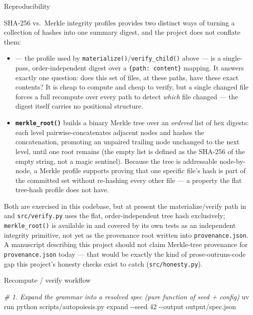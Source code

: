 \documentclass[
  ignorenonframetext,
]{beamer}
\newenvironment{Shaded}{}{}
\newcommand{\AttributeTok}[1]{\textcolor[rgb]{0.49,0.56,0.16}{#1}}
\newcommand{\CommentTok}[1]{\textcolor[rgb]{0.38,0.63,0.69}{\textit{#1}}}
\newcommand{\ExtensionTok}[1]{#1}
\newcommand{\NormalTok}[1]{#1}
\providecommand{\tightlist}{%
  \setlength{\itemsep}{0pt}\setlength{\parskip}{0pt}}
\begin{document}
\begin{frame}{Reproducibility}
\begin{block}{SHA-256 vs.~Merkle integrity profiles}
\protect{}\label{sha-256-vs.-merkle-integrity-profiles}
 provides two distinct ways of turning a
collection of hashes into one summary digest, and the project does not
conflate them:

\begin{itemize}
\tightlist
\item
  \textbf{} --- the profile
  used by \texttt{materialize()}/\texttt{verify\_child()} above --- is a
  single-pass, order-independent digest over a
  \texttt{\{path:\ content\}} mapping. It answers exactly one question:
  does this set of files, at these paths, have these exact contents? It
  is cheap to compute and cheap to verify, but a single changed file
  forces a full recompute over every path to detect \emph{which} file
  changed --- the digest itself carries no positional structure.
\item
  \textbf{\texttt{merkle\_root()}} builds a binary Merkle tree
   over an \emph{ordered} list of hex
  digests: each level pairwise-concatenates adjacent nodes and hashes
  the concatenation, promoting an unpaired trailing node unchanged to
  the next level, until one root remains (the empty list is defined as
  the SHA-256 of the empty string, not a magic sentinel). Because the
  tree is addressable node-by-node, a Merkle profile supports proving
  that one specific file's hash is part of the committed set without
  re-hashing every other file --- a property the flat tree-hash profile
  does not have.
\end{itemize}

Both are exercised in this codebase, but at present the
materialize/verify path in  and
\texttt{src/verify.py} uses the flat, order-independent tree hash
exclusively; \texttt{merkle\_root()} is available in
 and covered by its own tests as an independent
integrity primitive, not yet as the provenance root written into
\texttt{provenance.json}. A manuscript describing this project should
not claim Merkle-tree provenance for \texttt{provenance.json} today ---
that would be exactly the kind of prose-outruns-code gap this project's
honesty checks exist to catch (\texttt{src/honesty.py}).
\end{block}

\begin{block}{Recompute / verify workflow}
\protect{}\label{recompute-verify-workflow}
\begin{Shaded}
\begin{Highlighting}[]
\CommentTok{\# 1. Expand the grammar into a resolved spec (pure function of seed + config)}
\ExtensionTok{uv}\NormalTok{ run python scripts/autopoiesis.py expand }\AttributeTok{{-}{-}seed}\NormalTok{ 42 }\AttributeTok{{-}{-}output}\NormalTok{ output/spec.json}


\end{Highlighting}
\end{Shaded}
\end{block}
\end{frame}
\end{document}
